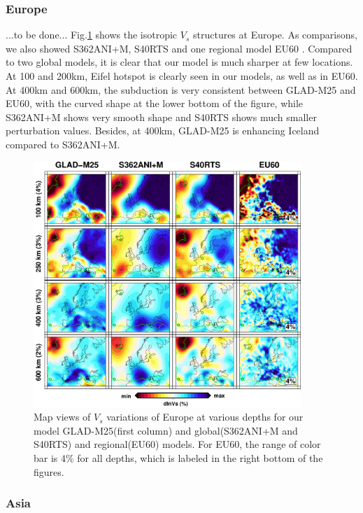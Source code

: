 \documentclass[extra,mreferee]{gji}
\begin{document}
\subsubsection{Europe}

...to be done...
Fig.\ref{fig:europe-vs} shows the isotropic $V_s$ structures at Europe. As
comparisons, we also showed S362ANI+M, S40RTS and one regional model EU60
\citep{zhu2015seismic}. Compared to two global models, it is clear that
our model is much sharper at few locations. At 100 and 200km, Eifel
hotspot is clearly seen in our models, as well as in EU60. At 400km
and 600km, the subduction is very consistent between GLAD-M25 and EU60,
with the curved shape at the lower bottom of the figure,
while S362ANI+M shows very smooth shape and S40RTS shows much smaller 
perturbation values. Besides, at 400km, GLAD-M25 is enhancing Iceland
compared to S362ANI+M.

\begin{figure}
\includegraphics[width=0.9\textwidth]{figures/depth_slice/europe_vs.pdf}
  \caption{Map views of $V_s$ variations of Europe at various depths for our
  model GLAD-M25(first column) and global(S362ANI+M and S40RTS) and
  regional(EU60\citep{zhu2015seismic}) models. For EU60, the range of color
  bar is 4\% for all depths, which is labeled in the right bottom of the figures.}
\label{fig:europe-vs}
\centering
\end{figure}

\subsubsection{Asia}
\end{document}
